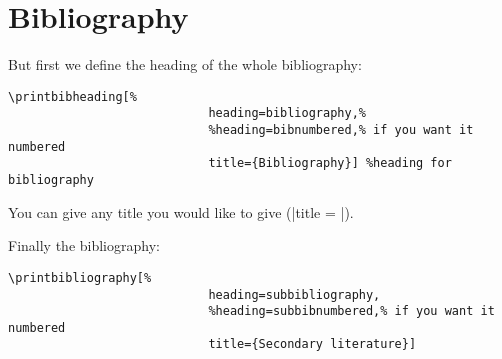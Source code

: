 \documentclass[a4paper,
10pt,
english
]{ltxdoc}
\begin{document}
 \section{Bibliography}\label{bibliographie}
 \DescribeMacro{\printbibliography}
But first we define the heading of the whole  bibliography:
\begin{lstlisting}
\printbibheading[%
							heading=bibliography,%
							%heading=bibnumbered,% if you want it numbered
							title={Bibliography}] %heading for bibliography
\end{lstlisting}
You can give any title you would like to give (|title = |).

Finally the bibliography:
\begin{lstlisting}
\printbibliography[%
							heading=subbibliography,
							%heading=subbibnumbered,% if you want it numbered
							title={Secondary literature}]
\end{lstlisting}

%
%
%
%
\end{document}
